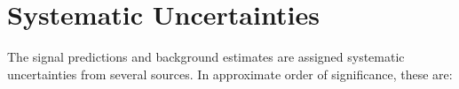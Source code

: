 

\clearpage

\section{Systematic Uncertainties}\label{sec:resonance-systematic-uncertainties}
The signal predictions and background estimates are assigned systematic uncertainties from several sources. In approximate order of significance, these are:

